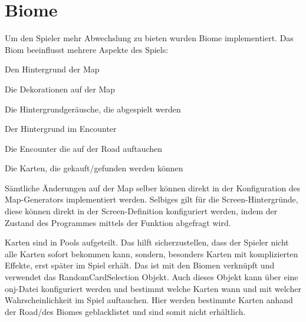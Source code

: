 
\section{Biome}\label{sec:biome}

\renewcommand{\kapitelautor}{Autor: Marvin Kurka}

Um den Spieler mehr Abwechslung zu bieten wurden Biome implementiert.
Das Biom beeinflusst mehrere Aspekte des Spiels:

\begin{liste}
    \item Den Hintergrund der Map
    \item Die Dekorationen auf der Map
    \item Die Hintergrundgeräusche, die abgespielt werden
    \item Der Hintergrund im Encounter
    \item Die Encounter die auf der Road auftauchen
    \item Die Karten, die gekauft/gefunden werden können
\end{liste}

Sämtliche Änderungen auf der Map selber können direkt in der Konfiguration des Map-Generators implementiert werden.
Selbiges gilt für die Screen-Hintergründe, diese können direkt in der Screen-Definition konfiguriert werden, indem
der Zustand des Programmes mittels der  Funktion abgefragt wird.

Karten sind in Pools aufgeteilt.
Das hilft sicherzustellen, dass der Spieler nicht alle Karten sofort bekommen kann, sondern, besonders Karten mit
komplizierten Effekte, erst später im Spiel erhält.
Das ist mit den Biomen verknüpft und verwendet das RandomCardSelection Objekt.
Auch dieses Objekt kann über eine onj-Datei konfiguriert werden und bestimmt welche Karten wann und mit welcher
Wahrscheinlichkeit im Spiel auftauchen.
Hier werden bestimmte Karten anhand der Road/des Biomes geblacklistet und sind somit nicht erhältlich.

\renewcommand{\kapitelautor}{}

